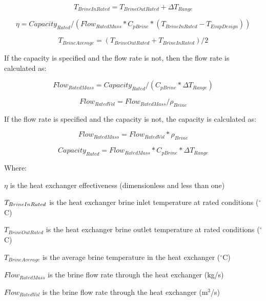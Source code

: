 \begin{equation}
T_{BrineInRated} = T_{BrineOutRated} + \Delta T_{Range}
\end{equation}

\begin{equation}
\eta = Capacity_{Rated} / (Flow_{RatedMass} * C_{pBrine} * (T_{BrineInRated} - T_{EvapDesign}))
\end{equation}

\begin{equation}
T_{BrineAverage} = (T_{BrineOutRated} + T_{BrineInRated})/2
\end{equation}

If the capacity is specified and the flow rate is not, then the flow rate is calculated as:

\begin{equation}
Flow_{RatedMass} = Capacity_{Rated}/(C_{pBrine} * \Delta T_{Range})
\end{equation}

\begin{equation}
Flow_{RatedVol} = Flow_{RatedMass} / {\rho}_{Brine}
\end{equation}

If the flow rate is specified and the capacity is not, the capacity is calculated as:

\begin{equation}
Flow_{RatedMass} = Flow_{RatedVol}*{\rho}_{Brine}
\end{equation}

\begin{equation}
Capacity_{Rated} = Flow_{RatedMass} * C_{pBrine} * \Delta T_{Range}
\end{equation}

Where:

\(\eta\) is the heat exchanger effectiveness (dimensionless and less than one)

\(T_{BrineInRated\\}\) is the heat exchanger brine inlet temperature at rated conditions (\(^{\circ}\)C)

\(T_{BrineOutRated}\) is the heat exchanger brine outlet temperature at rated conditions (\(^{\circ}\)C)

\(T_{BrineAverage}\) is the average brine temperature in the heat exchanger (\(^{\circ}\)C)

\(Flow_{RatedMass}\) is the brine flow rate through the heat exchanger (kg/s)

\(Flow_{RatedVol}\) is the brine flow rate through the heat exchanger (m\(^{3}\)/s)

